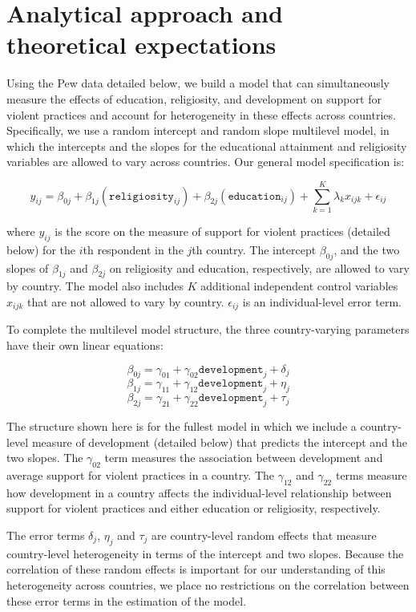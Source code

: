 \documentclass[10pt,letterpaper]{article}
\begin{document}
\section*{Analytical approach and theoretical expectations}

Using the Pew data detailed below, we build a model that can
simultaneously measure the effects of education, religiosity, and
development on support for violent practices and account for
heterogeneity in these effects across countries. Specifically, we use a
random intercept and random slope multilevel model, in which the
intercepts and the slopes for the educational attainment and religiosity
variables are allowed to vary across countries. Our general model
specification is:

\[y_{ij}=\beta_{0j}+\beta_{1j}(\texttt{religiosity}_{ij})+\beta_{2j}(\texttt{education}_{ij})+\sum_{k=1}^K \lambda_kx_{ijk}+\epsilon_{ij}\]

where \(y_{ij}\) is the score on the measure of support for violent
practices (detailed below) for the \(i\)th respondent in the \(j\)th
country. The intercept \(\beta_{0j}\), and the two slopes of
\(\beta_{1j}\) and \(\beta_{2j}\) on religiosity and education,
respectively, are allowed to vary by country. The model also includes
\(K\) additional independent control variables \(x_{ijk}\) that are not
allowed to vary by country. \(\epsilon_{ij}\) is an individual-level
error term.

To complete the multilevel model structure, the three country-varying
parameters have their own linear equations:

\[\beta_{0j}=\gamma_{01}+\gamma_{02}\texttt{development}_j+\delta_j\]
\[\beta_{1j}=\gamma_{11}+\gamma_{12}\texttt{development}_j+\eta_j\]
\[\beta_{2j}=\gamma_{21}+\gamma_{22}\texttt{development}_j+\tau_j\]

The structure shown here is for the fullest model in which we include a
country-level measure of development (detailed below) that predicts the
intercept and the two slopes. The \(\gamma_{02}\) term measures the
association between development and average support for violent
practices in a country. The \(\gamma_{12}\) and \(\gamma_{22}\) terms
measure how development in a country affects the individual-level
relationship between support for violent practices and either education
or religiosity, respectively.

The error terms \(\delta_j\), \(\eta_j\) and \(\tau_j\) are
country-level random effects that measure country-level heterogeneity in
terms of the intercept and two slopes. Because the correlation of these
random effects is important for our understanding of this heterogeneity
across countries, we place no restrictions on the correlation between
these error terms in the estimation of the model.
\end{document}
